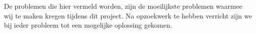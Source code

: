 De problemen die hier vermeld worden, zijn de moeilijkste problemen waarmee wij te maken kregen tijdens dit project. Na opzoekwerk te hebben verricht zijn we bij ieder probleem tot een mogelijke oplossing gekomen.